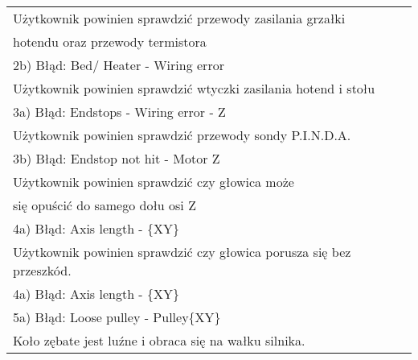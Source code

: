 \documentclass{article}
\begin{document}
\begin{enumerate}[label=\arabic*.]
\begin{tabular}{|p{5cm}|p{3cm}|p{3cm}|p{3cm}|p{}|p{3cm}|}
\multicolumn{6}{|l|}{Użytkownik powinien sprawdzić przewody zasilania grzałki } \\ 
\multicolumn{6}{|l|}{hotendu oraz przewody termistora} \\ 
\multicolumn{6}{|l|}{2b) Błąd: Bed/ Heater - Wiring error} \\
\multicolumn{6}{|l|}{Użytkownik powinien sprawdzić wtyczki zasilania hotend i stołu } \\ 
\multicolumn{6}{|l|}{3a) Błąd: Endstops - Wiring error - Z} \\
\multicolumn{6}{|l|}{Użytkownik powinien sprawdzić przewody sondy P.I.N.D.A.} \\
\multicolumn{6}{|l|}{3b) Błąd: Endstop not hit - Motor Z} \\
\multicolumn{6}{|l|}{Użytkownik powinien sprawdzić czy głowica może} \\
\multicolumn{6}{|l|}{się opuścić do samego dołu osi Z} \\
\multicolumn{6}{|l|}{4a) Błąd: Axis length - \{XY\}} \\
\multicolumn{6}{|l|}{Użytkownik powinien sprawdzić czy głowica porusza się bez przeszkód. } \\
\multicolumn{6}{|l|}{4a) Błąd: Axis length - \{XY\}} \\
\multicolumn{6}{|l|}{5a) Błąd: Loose pulley - Pulley\{XY\}} \\
\multicolumn{6}{|l|}{Koło zębate jest luźne i obraca się na wałku silnika. } \\ 
\hline

\end{tabular}


\end{enumerate}
\end{document}
